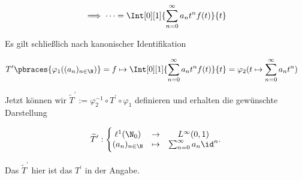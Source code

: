 \begin{solution}
\begin{align*}
  \implies
  \cdots
  =
  \Int[0][1]{\sum_{n=0}^\infty a_n t^n f(t)}{t}
\end{align*}

Es gilt schließlich nach kanonischer Identifikation

\begin{align*}
  T^\prime \pbraces
  {
    \varphi_1((a_n)_{n \in \N})
  }
  & =
  f
  \mapsto
  \Int[0][1]{\sum_{n=0}^\infty a_n t^n f(t)}{t}
  =
  \varphi_2(t \mapsto \sum_{n=0}^\infty a_n t^n)
\end{align*}

Jetzt können wir $\widetilde{T}^\prime := \varphi_2^{-1} \circ T^\prime \circ \varphi_1$ definieren und erhalten die gewünschte Darstellung

\begin{align*}
  \widetilde{T}^{\prime}:
  \Bigg \{
  \begin{matrix}
    \ell^1(\N_0) &
    \to          &
    L^\infty(0, 1) \\
    (a_n)_{n \in \N} &
    \mapsto          &
    \sum_{n=0}^\infty a_n \id^n
  \end{matrix}.
\end{align*}

Das $\widetilde{T}^\prime$ hier ist das $T^\prime$ in der Angabe.

\end{solution}
